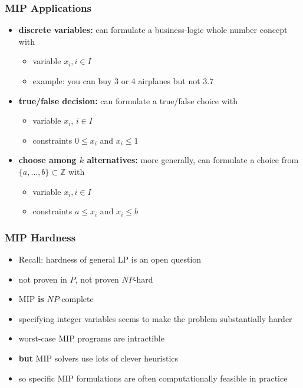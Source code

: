 \documentclass[10pt,aspectratio=169]{beamer}
\begin{document}
\begin{frame} \frametitle{MIP Applications}
  \begin{itemize}
  \item \textbf{discrete variables:} can formulate a business-logic whole number concept with
  \begin{itemize}
    \item variable $x_i, i \in I$
    \item example: you can buy 3 or 4 airplanes but not 3.7
  \end{itemize}
  \item \textbf{true/false decision:} can formulate a true/false choice with
    \begin{itemize}
    \item variable $x_i$, $i \in I$
    \item constraints $0 \leq x_i$ and $x_i \leq 1$
    \end{itemize}
\item \textbf{choose among $k$ alternatives:} more generally, can
  formulate a choice from $\{a, \ldots, b\} \subset \mathbb{Z}$ with
  \begin{itemize}
  \item variable $x_i, i \in I$
  \item constraints $a \leq x_i$ and $x_i \leq b$
    \end{itemize}
  \end{itemize}
\end{frame}

\begin{frame} \frametitle{MIP Hardness}
  \begin{itemize}
  \item Recall: hardness of general LP is an open question
  \item not proven in $P$, not proven $NP$-hard
  \item MIP \textbf{is} $NP$-complete
  \item specifying integer variables seems to make the problem substantially harder
  \item worst-case MIP programs are intractible
  \item \textbf{but} MIP solvers use lots of clever heuristics
  \item so specific MIP formulations are often computationally feasible in practice
  \end{itemize}
\end{frame}
\end{document}
